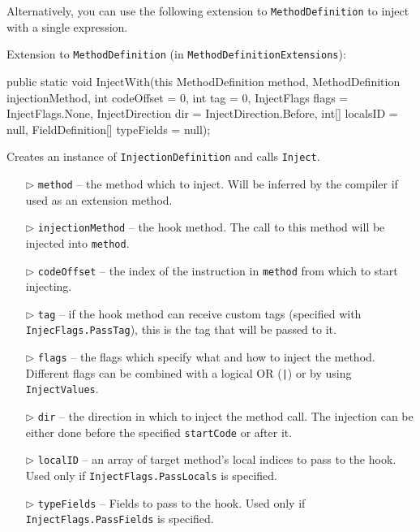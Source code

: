 \documentclass[a4paper,11pt]{article}
\begin{document}
Alternatively, you can use the following extension to \texttt{MethodDefinition} to inject with a single expression.

\begin{mdef}
Extension to \texttt{MethodDefinition} (in \texttt{MethodDefinitionExtensions}):
\begin{cs}
public static void InjectWith(this MethodDefinition method,
                        MethodDefinition injectionMethod,
                        int codeOffset = 0,
                        int tag = 0,
                        InjectFlags flags = InjectFlags.None,
                        InjectDirection dir = InjectDirection.Before,
                        int[] localsID = null,
                        FieldDefinition[] typeFields = null);
\end{cs}

Creates an instance of \texttt{InjectionDefinition} and calls \texttt{Inject}.

\begin{itemize}
\item[$\triangleright$] \texttt{method} -- the method which to inject. Will be inferred by the compiler if used as an extension method.
\item[$\triangleright$] \texttt{injectionMethod} -- the hook method. The call to this method will be injected into \texttt{method}.
\item[$\triangleright$] \texttt{codeOffset} -- the index of the instruction in \texttt{method} from which to start injecting.
\item[$\triangleright$] \texttt{tag} -- if the hook method can receive custom tags (specified with \texttt{InjecFlags.PassTag}), this is the tag that will be passed to it.
\item[$\triangleright$] \texttt{flags} -- the flags which specify what and how to inject the method. Different flags can be combined with a logical OR (\texttt{|}) or by using \texttt{InjectValues}.
\item[$\triangleright$] \texttt{dir} -- the direction in which to inject the method call. The injection can be either done before the specified \texttt{startCode} or after it.
\item[$\triangleright$] \texttt{localID} -- an array of target method's local indices to pass to the hook. Used only if \texttt{InjectFlags.PassLocals} is specified.
\item[$\triangleright$] \texttt{typeFields} -- Fields to pass to the hook. Used only if \texttt{InjectFlags.PassFields} is specified.
\end{itemize}


\end{mdef}
\end{document}
